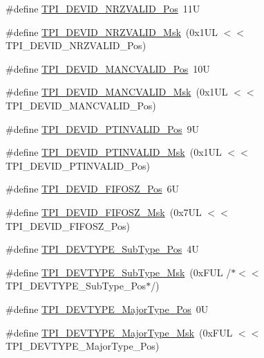 \begin{DoxyCompactItemize}
\item 
\#define \mbox{\hyperlink{group___c_m_s_i_s___t_p_i_ga9f46cf1a1708575f56d6b827766277f4}{T\+P\+I\+\_\+\+D\+E\+V\+I\+D\+\_\+\+N\+R\+Z\+V\+A\+L\+I\+D\+\_\+\+Pos}}~11U
\item 
\#define \mbox{\hyperlink{group___c_m_s_i_s___t_p_i_gacecc8710a8f6a23a7d1d4f5674daf02a}{T\+P\+I\+\_\+\+D\+E\+V\+I\+D\+\_\+\+N\+R\+Z\+V\+A\+L\+I\+D\+\_\+\+Msk}}~(0x1\+U\+L $<$$<$ T\+P\+I\+\_\+\+D\+E\+V\+I\+D\+\_\+\+N\+R\+Z\+V\+A\+L\+I\+D\+\_\+\+Pos)
\item 
\#define \mbox{\hyperlink{group___c_m_s_i_s___t_p_i_ga675534579d9e25477bb38970e3ef973c}{T\+P\+I\+\_\+\+D\+E\+V\+I\+D\+\_\+\+M\+A\+N\+C\+V\+A\+L\+I\+D\+\_\+\+Pos}}~10U
\item 
\#define \mbox{\hyperlink{group___c_m_s_i_s___t_p_i_ga4c3ee4b1a34ad1960a6b2d6e7e0ff942}{T\+P\+I\+\_\+\+D\+E\+V\+I\+D\+\_\+\+M\+A\+N\+C\+V\+A\+L\+I\+D\+\_\+\+Msk}}~(0x1\+U\+L $<$$<$ T\+P\+I\+\_\+\+D\+E\+V\+I\+D\+\_\+\+M\+A\+N\+C\+V\+A\+L\+I\+D\+\_\+\+Pos)
\item 
\#define \mbox{\hyperlink{group___c_m_s_i_s___t_p_i_ga974cccf4c958b4a45cb71c7b5de39b7b}{T\+P\+I\+\_\+\+D\+E\+V\+I\+D\+\_\+\+P\+T\+I\+N\+V\+A\+L\+I\+D\+\_\+\+Pos}}~9U
\item 
\#define \mbox{\hyperlink{group___c_m_s_i_s___t_p_i_ga1ca84d62243e475836bba02516ba6b97}{T\+P\+I\+\_\+\+D\+E\+V\+I\+D\+\_\+\+P\+T\+I\+N\+V\+A\+L\+I\+D\+\_\+\+Msk}}~(0x1\+U\+L $<$$<$ T\+P\+I\+\_\+\+D\+E\+V\+I\+D\+\_\+\+P\+T\+I\+N\+V\+A\+L\+I\+D\+\_\+\+Pos)
\item 
\#define \mbox{\hyperlink{group___c_m_s_i_s___t_p_i_ga3c7bb073c7ef96c2c3491c523fcb5bbe}{T\+P\+I\+\_\+\+D\+E\+V\+I\+D\+\_\+\+F\+I\+F\+O\+S\+Z\+\_\+\+Pos}}~6U
\item 
\#define \mbox{\hyperlink{group___c_m_s_i_s___t_p_i_gac7e718d8f239920d5b65e3eaa1c490df}{T\+P\+I\+\_\+\+D\+E\+V\+I\+D\+\_\+\+F\+I\+F\+O\+S\+Z\+\_\+\+Msk}}~(0x7\+U\+L $<$$<$ T\+P\+I\+\_\+\+D\+E\+V\+I\+D\+\_\+\+F\+I\+F\+O\+S\+Z\+\_\+\+Pos)
\item 
\#define \mbox{\hyperlink{group___c_m_s_i_s___t_p_i_ga0c799ff892af5eb3162d152abc00af7a}{T\+P\+I\+\_\+\+D\+E\+V\+T\+Y\+P\+E\+\_\+\+Sub\+Type\+\_\+\+Pos}}~4U
\item 
\#define \mbox{\hyperlink{group___c_m_s_i_s___t_p_i_ga5b2fd7dddaf5f64855d9c0696acd65c1}{T\+P\+I\+\_\+\+D\+E\+V\+T\+Y\+P\+E\+\_\+\+Sub\+Type\+\_\+\+Msk}}~(0x\+F\+U\+L /$\ast$$<$$<$ T\+P\+I\+\_\+\+D\+E\+V\+T\+Y\+P\+E\+\_\+\+Sub\+Type\+\_\+\+Pos$\ast$/)
\item 
\#define \mbox{\hyperlink{group___c_m_s_i_s___t_p_i_ga69c4892d332755a9f64c1680497cebdd}{T\+P\+I\+\_\+\+D\+E\+V\+T\+Y\+P\+E\+\_\+\+Major\+Type\+\_\+\+Pos}}~0U
\item 
\#define \mbox{\hyperlink{group___c_m_s_i_s___t_p_i_gaecbceed6d08ec586403b37ad47b38c88}{T\+P\+I\+\_\+\+D\+E\+V\+T\+Y\+P\+E\+\_\+\+Major\+Type\+\_\+\+Msk}}~(0x\+F\+U\+L $<$$<$ T\+P\+I\+\_\+\+D\+E\+V\+T\+Y\+P\+E\+\_\+\+Major\+Type\+\_\+\+Pos)
\end{DoxyCompactItemize}


